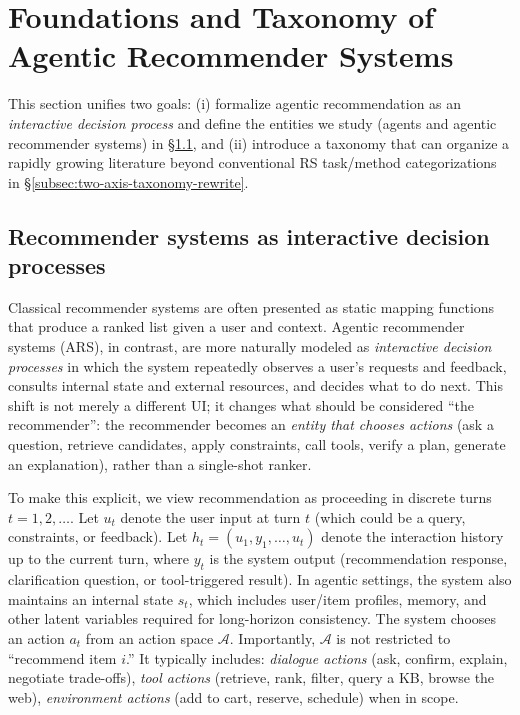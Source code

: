 \section{Foundations and Taxonomy of Agentic Recommender Systems}
\label{sec:foundations-taxonomy}

{This section unifies two goals: (i) formalize agentic recommendation as an \emph{interactive decision process} and
define the entities we study (agents and agentic recommender systems) in \S \ref{subsec:recommender_as_interactive_decision}, and (ii) introduce a taxonomy that can organize
a rapidly growing literature beyond conventional RS task/method categorizations in \S \ref{subsec:two-axis-taxonomy-rewrite}.}

\subsection{Recommender systems as interactive decision processes}
\label{subsec:recommender_as_interactive_decision} 


Classical recommender systems are often presented as static mapping functions that produce a ranked list given a user and context. Agentic recommender systems (ARS), in contrast, are more naturally modeled as \textit{interactive decision processes} in which the system repeatedly observes a user’s requests and feedback, consults internal state and external resources, and decides what to do next. This shift is not merely a different UI; it changes what should be considered “the recommender”: the recommender becomes an \textit{entity that chooses actions} (\eg ask a question, retrieve candidates, apply constraints, call tools, verify a plan, generate an explanation), rather than a single-shot ranker.

To make this explicit, we view recommendation as proceeding in discrete turns \(t = 1, 2, \dots\). Let \(u_t\) denote the user input at turn \(t\) (which could be a query, constraints, or feedback). Let \(h_t = (u_1, y_1, \dots, u_t)\) denote the interaction history up to the current turn, where \(y_t\) is the system output (\eg recommendation response, clarification question, or tool-triggered result). In agentic settings, the system also maintains an internal state \(s_t\), which includes {user/item profiles}, {memory}, and other latent variables required for long-horizon consistency. 
The system chooses an action \(a_t\) from an action space \(\mathcal{A}\). Importantly, \(\mathcal{A}\) is not restricted to “recommend item \(i\).” 
It typically includes: 
\textit{dialogue actions} (ask, confirm, explain, negotiate trade-offs), \textit{tool actions} (retrieve, rank, filter, query a KB, browse the web), \textit{environment actions} (\eg add to cart, reserve, schedule) when in scope.




